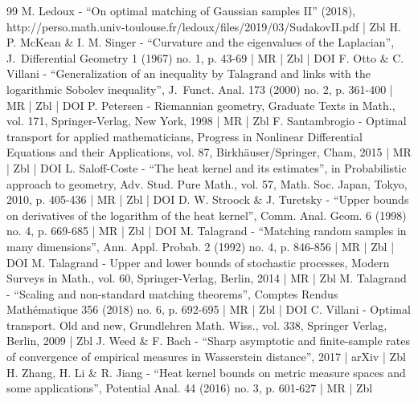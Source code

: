 \documentclass[10pt]{amsart}
\theoremstyle{plain}
\theoremstyle{definition}
\numberwithin{equation}{section}
\begin{document}
\begin{thebibliography}{99}
M. Ledoux - “On optimal matching of Gaussian samples II” (2018), http://perso.math.univ-toulouse.fr/ledoux/files/2019/03/SudakovII.pdf | Zbl
H. P. McKean \& I. M. Singer - “Curvature and the eigenvalues of the Laplacian”, J. Differential Geometry 1 (1967) no. 1, p. 43-69 | MR | Zbl | DOI
F. Otto \& C. Villani - “Generalization of an inequality by Talagrand and links with the logarithmic Sobolev inequality”, J. Funct. Anal. 173 (2000) no. 2, p. 361-400 | MR | Zbl | DOI
P. Petersen - Riemannian geometry, Graduate Texts in Math., vol. 171, Springer-Verlag, New York, 1998 | MR | Zbl
F. Santambrogio - Optimal transport for applied mathematicians, Progress in Nonlinear Differential Equations and their Applications, vol. 87, Birkhäuser/Springer, Cham, 2015 | MR | Zbl | DOI
L. Saloff-Coste - “The heat kernel and its estimates”, in Probabilistic approach to geometry, Adv. Stud. Pure Math., vol. 57, Math. Soc. Japan, Tokyo, 2010, p. 405-436 | MR | Zbl | DOI
D. W. Stroock \& J. Turetsky - “Upper bounds on derivatives of the logarithm of the heat kernel”, Comm. Anal. Geom. 6 (1998) no. 4, p. 669-685 | MR | Zbl | DOI
M. Talagrand - “Matching random samples in many dimensions”, Ann. Appl. Probab. 2 (1992) no. 4, p. 846-856 | MR | Zbl | DOI
M. Talagrand - Upper and lower bounds of stochastic processes, Modern Surveys in Math., vol. 60, Springer-Verlag, Berlin, 2014 | MR | Zbl
M. Talagrand - “Scaling and non-standard matching theorems”, Comptes Rendus Mathématique 356 (2018) no. 6, p. 692-695 | MR | Zbl | DOI
C. Villani - Optimal transport. Old and new, Grundlehren Math. Wiss., vol. 338, Springer Verlag, Berlin, 2009 | Zbl
J. Weed \& F. Bach - “Sharp asymptotic and finite-sample rates of convergence of empirical measures in Wasserstein distance”, 2017 | arXiv | Zbl
H. Zhang, H. Li \& R. Jiang - “Heat kernel bounds on metric measure spaces and some applications”, Potential Anal. 44 (2016) no. 3, p. 601-627 | MR | Zbl
\end{thebibliography}
\end{document}
